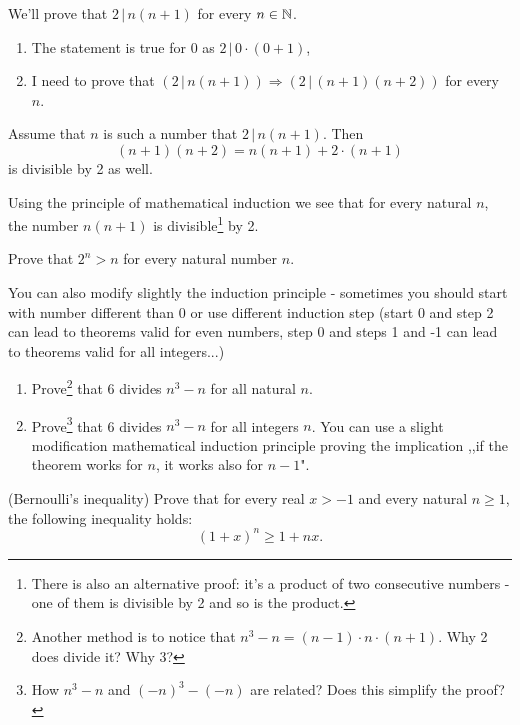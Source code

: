 \begin{example}
  We'll prove that $2\,|\,n(n+1)$ for every $n\in \mathbb N$.
  \begin{enumerate}
    \item The statement is true for $0$ as $2\,|\,0\cdot (0+1)$,
    \item I need to prove that $(2\,|\,n(n+1))\Rightarrow (2\,|\,(n+1)(n+2))$ for every $n$.
  \end{enumerate}
  Assume that $n$ is such a number that $2\,|\,n(n+1)$.
  Then $$(n+1)(n+2)=n(n+1) + 2\cdot (n+1)$$ is divisible by 2 as well.

  Using the principle of mathematical induction we see that for every natural $n$, the number $n(n+1)$ is divisible\footnote{There is also an alternative proof: it's
  a product of two consecutive numbers - one of them is divisible by 2 and so is the product.} by 2.
\end{example}

\begin{exercise}
	Prove that $2^n>n$ for every natural number $n$.
\end{exercise}

\noindent You can also modify slightly the induction principle - sometimes you should start with number different than 0 or use different induction step
(start 0 and step 2 can lead to theorems valid for even numbers, step 0 and steps 1 and -1 can lead to theorems valid for all integers...)
\begin{exercise}
    \begin{enumerate}
	   \item Prove\footnote{Another method is to notice that $n^3-n=(n-1)\cdot n\cdot (n+1)$. Why 2 does divide it? Why 3?} that 6 divides
		     $n^3-n$ for all natural $n$.
	    \item Prove\footnote{How $n^3-n$ and $(-n)^3-(-n)$ are related? Does this simplify the proof?} that 6 divides $n^3-n$ for all integers $n$.
		      You can use a slight modification mathematical induction principle proving the implication
		      ,,if the theorem works for $n$, it works also for $n-1$".
    \end{enumerate}
\end{exercise}

\begin{exercise}
	(Bernoulli's inequality) Prove that for every real $x > -1$ and every natural $n\ge 1$, the following inequality holds:
	$$(1+x)^n\ge 1+nx.$$
\end{exercise}

